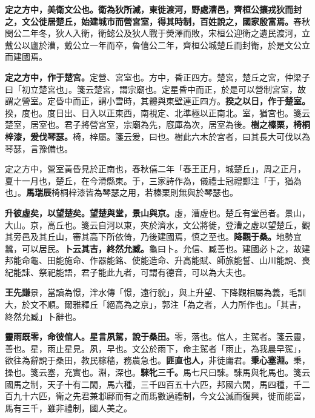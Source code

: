 \textbf{定之方中，美衛文公也。衛為狄所滅，東徙渡河，野處漕邑，齊桓公攘戎狄而封之，文公徙居楚丘，始建城市而營宮室，得其時制，百姓說之，國家殷富焉。}{\footnotesize 春秋閔公二年冬，狄人入衛，衛懿公及狄人戰于熒澤而敗，宋桓公迎衛之遺民渡河，立戴公以廬於漕，戴公立一年而卒，魯僖公二年，齊桓公城楚丘而封衛，於是文公立而建國焉。}

\textbf{定之方中，作于楚宮。}{\footnotesize 定營、宮室也。方中，昏正四方。楚宮，楚丘之宮，仲梁子曰「初立楚宮也」。箋云楚宮，謂宗廟也。定星昏中而正，於是可以營制宮室，故謂之營室。定昏中而正，謂小雪時，其體與東壁連正四方。}\textbf{揆之以日，作于楚室。}{\footnotesize 揆，度也。度日出、日入以正東西，南視定、北準極以正南北。室，猶宮也。箋云楚室，居室也。君子將營宮室，宗廟為先，廐庫為次，居室為後。}\textbf{樹之榛栗，椅桐梓漆，爰伐琴瑟。}{\footnotesize 椅，梓屬。箋云爰，曰也。樹此六木於宮者，曰其長大可伐以為琴瑟，言豫備也。}

\begin{quoting}定之方中，營室黃昏見於正南也，春秋僖二年「春王正月，城楚丘」，周之正月，夏十一月也，楚丘，在今滑縣東。于，三家詩作為，儀禮士冠禮鄭注「于，猶為也」。\textbf{馬瑞辰}椅桐梓漆皆為琴瑟之用，若榛栗則無與於琴瑟也。\end{quoting}

\textbf{升彼虛矣，以望楚矣。望楚與堂，景山與京。}{\footnotesize 虛，漕虛也。楚丘有堂邑者。景山，大山。京，高丘也。箋云自河以東，夾於濟水，文公將徙，登漕之虛以望楚丘，觀其旁邑及其丘山，審其高下所依倚，乃後建國焉，慎之至也。}\textbf{降觀于桑。}{\footnotesize 地勢宜蠶，可以居民。}\textbf{卜云其吉，終然允臧。}{\footnotesize 龜曰卜。允信、臧善也。建國必卜之，故建邦能命龜、田能施命、作器能銘、使能造命、升高能賦、師旅能誓、山川能說、喪紀能誄、祭祀能語，君子能此九者，可謂有德音，可以為大夫也。}

\begin{quoting}\textbf{王先謙}景，當讀為憬，泮水傳「憬，遠行貌」，與上升望、下降觀相屬為義，毛訓大，於文不順。爾雅釋丘「絕高為之京」，郭注「為之者，人力所作也」。「其吉，終然允臧」卜辭也。\end{quoting}

\textbf{靈雨既零，命彼倌人。星言夙駕，說于桑田。}{\footnotesize 零，落也。倌人，主駕者。箋云靈，善也。星，雨止星見。夙，早也。文公於雨下，命主駕者「雨止，為我晨早駕」，欲往為辭說于桑田，教民稼穡，務農急也。}\textbf{匪直也人，}{\footnotesize 非徒庸君。}\textbf{秉心塞淵。}{\footnotesize 秉，操也。箋云塞，充實也。淵，深也。}\textbf{騋牝三千。}{\footnotesize 馬七尺曰騋。騋馬與牝馬也。箋云國馬之制，天子十有二閑，馬六種，三千四百五十六匹，邦國六閑，馬四種，千二百九十六匹，衛之先君兼邶鄘而有之而馬數過禮制，今文公滅而復興，徙而能富，馬有三千，雖非禮制，國人美之。}

